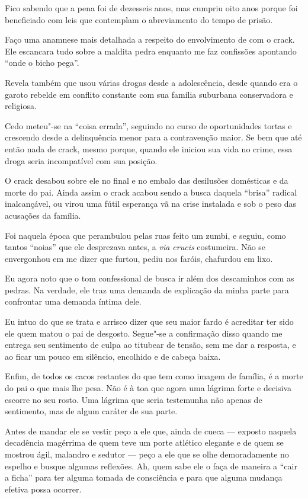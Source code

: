 Fico sabendo que a pena foi de dezesseis anos, mas  cumpriu oito anos
porque foi beneficiado com leis que contemplam o abreviamento do tempo
de prisão.

\asterisc{}

Faço uma anamnese mais detalhada a respeito do envolvimento de  com o
crack. Ele escancara tudo sobre a maldita pedra enquanto me faz
confissões apontando ``onde o bicho pega''.

Revela também que usou várias drogas desde a adolescência, desde quando
era o garoto rebelde em conflito constante com sua família suburbana
conservadora e religiosa.

Cedo meteu"-se na ``coisa errada'', seguindo no curso de oportunidades
tortas e crescendo desde a delinquência menor para a contravenção maior.
Se bem que até então nada de crack, mesmo porque, quando ele iniciou sua
vida no crime, essa droga seria incompatível com sua posição.

O crack desabou sobre ele no final e no embalo das desilusões domésticas
e da morte do pai. Ainda assim o crack acabou sendo a busca daquela
``brisa'' radical inalcançável, ou virou uma fútil esperança vã na crise
instalada e sob o peso das acusações da família.

Foi naquela época que  perambulou pelas ruas feito um zumbi, e seguiu,
como tantos ``noias'' que ele desprezava antes, a \emph{via crucis}
costumeira. Não se envergonhou em me dizer que furtou, pediu nos faróis,
chafurdou em lixo.

Eu agora noto que o tom confessional de  busca ir além dos descaminhos
com as pedras. Na verdade, ele traz uma demanda de explicação da minha
parte para confrontar uma demanda íntima dele.

Eu intuo do que se trata e arrisco dizer que seu maior fardo é acreditar
ter sido ele quem matou o pai de desgosto. Segue"-se a confirmação disso
quando  me entrega seu sentimento de culpa ao titubear de tensão, sem
me dar a resposta, e ao ficar um pouco em silêncio, encolhido e de
cabeça baixa.

Enfim, de todos os cacos restantes do que  tem como imagem de família,
é a morte do pai o que mais lhe pesa. Não é à toa que agora uma lágrima
forte e decisiva escorre no seu rosto. Uma lágrima que seria testemunha
não apenas de sentimento, mas de algum caráter de sua parte.

Antes de mandar ele se vestir peço a ele que, ainda de cueca --- exposto
naquela decadência magérrima de quem teve um porte atlético elegante e
de quem se mostrou ágil, malandro e sedutor --- peço a ele que se olhe
demoradamente no espelho e busque algumas reflexões. Ah, quem sabe ele o
faça de maneira a ``cair a ficha'' para ter alguma tomada de consciência
e para que alguma mudança efetiva possa ocorrer.

